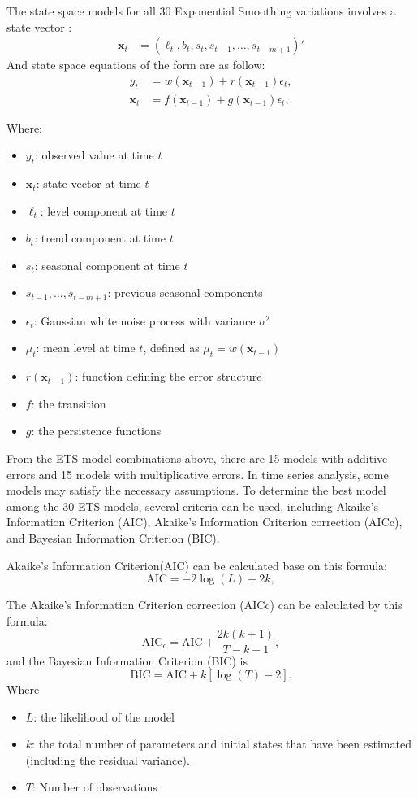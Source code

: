 \documentclass{ieeeojies}
\begin{document}
\noindent The state space models for all 30 Exponential Smoothing variations involves a state vector \cite{b9}:
\begin{align}
    \mathbf{x}_t &= (\ell_t, b_t, s_t, s_{t-1}, \ldots, s_{t-m+1})'
\end{align}
And state space equations of the form are as follow:
\begin{align}
    y_t &= w(\mathbf{x}_{t-1}) + r(\mathbf{x}_{t-1})\epsilon_t,  \\
    \mathbf{x}_t &= f(\mathbf{x}_{t-1}) + g(\mathbf{x}_{t-1})\epsilon_t, 
\end{align}

Where:
\begin{itemize}
    \item \( y_t \): observed value at time \( t \)
    \item \( \mathbf{x}_t \): state vector at time \( t \)
    \item \( \ell_t \): level component at time \( t \)
    \item \( b_t \): trend component at time \( t \)
    \item \( s_t \): seasonal component at time \( t \)
    \item \( s_{t-1}, \ldots, s_{t-m+1} \): previous seasonal components
    \item \( \epsilon_t \): Gaussian white noise process with variance \( \sigma^2 \)
    \item \( \mu_t \): mean level at time \( t \), defined as \( \mu_t = w(\mathbf{x}_{t-1}) \)
    \item \( r(\mathbf{x}_{t-1}) \): function defining the error structure
    \item \(f\): the transition
    \item \(g\): the persistence functions
\end{itemize}

From the ETS model combinations above, there are 15 models with additive errors and 15 models with multiplicative errors. In time series analysis, some models may satisfy the necessary assumptions. To determine the best model among the 30 ETS models, several criteria can be used, including Akaike's Information Criterion (AIC), Akaike's Information Criterion correction (AICc), and Bayesian Information Criterion (BIC)\cite{b9}.

Akaike's Information Criterion(AIC) can be calculated base on this formula:
\[
\text{AIC} = -2 \log(L) + 2k,
\]

The Akaike's Information Criterion correction (AICc) can be calculated by this formula:
\[
\text{AIC}_c = \text{AIC} + \frac{2k(k+1)}{T-k-1},
\]
and the Bayesian Information Criterion (BIC) is
\[
\text{BIC} = \text{AIC} + k[\log(T) - 2].
\]
Where 
\begin{itemize}
    \item \( L \): the likelihood of the model
    \item \( k \): the total number of parameters and initial states that have been estimated (including the residual variance).
    \item \(T\): Number of observations
\end{itemize}
\end{document}
